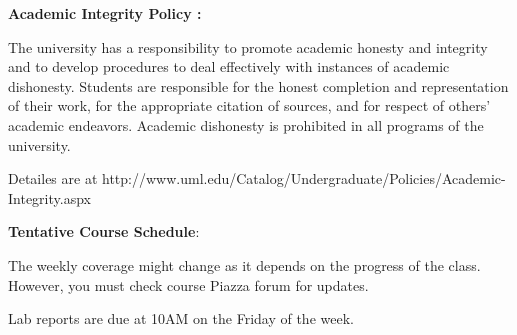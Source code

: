 \documentclass[11pt]{article}
\begin{document}
\textbf {\large Academic Integrity Policy :} 

The university has a responsibility to promote academic honesty and integrity and to develop procedures to deal effectively with instances of academic dishonesty. Students are responsible for the honest completion and representation of their work, for the appropriate citation of sources, and for respect of others’ academic endeavors. Academic dishonesty is prohibited in all programs of the university.

Detailes are at http://www.uml.edu/Catalog/Undergraduate/Policies/Academic-Integrity.aspx


\newpage

\textbf {\large Tentative Course Schedule}:

The weekly coverage might change as it depends on the progress of the class.  However, you must check course Piazza forum for updates.

Lab reports are due at 10AM on the Friday of the week. 
\end{document}
